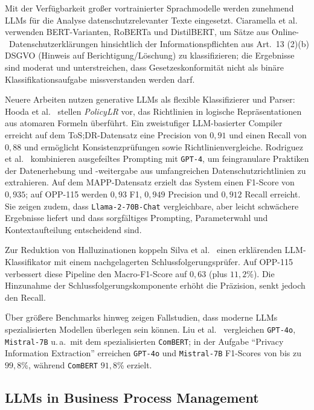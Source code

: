 Mit der Verfügbarkeit großer vortrainierter Sprachmodelle werden zunehmend \acp{LLM} für die Analyse datenschutzrelevanter Texte eingesetzt. Ciaramella et al.\ \cite{ciaramella2022leveraging} verwenden BERT-Varianten, RoBERTa und DistilBERT, um Sätze aus Online-\linebreak~Datenschutzerklärungen hinsichtlich der Informationspflichten aus Art.~13 (2)(b) \ac{DSGVO} (Hinweis auf Berichtigung/Löschung) zu klassifizieren; die Ergebnisse sind moderat und unterstreichen, dass Gesetzeskonformität nicht als binäre Klassifikationsaufgabe missverstanden werden darf.

Neuere Arbeiten nutzen generative \acp{LLM} als flexible Klassifizierer und Parser: Hooda et al.\ \cite{hooda2024policylr} stellen \emph{PolicyLR} vor, das Richtlinien in logische Repräsentationen aus atomaren Formeln überführt. Ein zweistufiger \ac{LLM}-basierter Compiler erreicht auf dem ToS;DR-Datensatz eine Precision von $0{,}91$ und einen Recall von $0{,}88$ und ermöglicht Konsistenzprüfungen sowie Richtlinienvergleiche. Rodriguez et al.\ \cite{rodriguez2024largelanguagemodels} kombinieren ausgefeiltes Prompting mit \texttt{GPT-4}, um feingranulare Praktiken der Datenerhebung und -weitergabe aus umfangreichen Datenschutzrichtlinien zu extrahieren. Auf dem MAPP-Datensatz erzielt das System einen F1-Score von $0{,}935$; auf OPP-115 werden $0{,}93$ F1, $0{,}949$ Precision und $0{,}912$ Recall erreicht. Sie zeigen zudem, dass \texttt{Llama-2-70B-Chat} vergleichbare, aber leicht schwächere Ergebnisse liefert und dass sorgfältiges Prompting, Parameterwahl und Kontextaufteilung entscheidend sind.

Zur Reduktion von Halluzinationen koppeln Silva et al.\ \cite{silva2024entailment} einen erklärenden \ac{LLM}-Klassifikator mit einem nachgelagerten Schlussfolgerungsprüfer. Auf OPP-115 verbessert diese Pipeline den Macro-F1-Score auf $0{,}63$ (plus $11{,}2$\%). Die Hinzunahme der Schlussfolgerungskomponente erhöht die Präzision, senkt jedoch den Recall.

Über größere Benchmarks hinweg zeigen Fallstudien, dass moderne \acp{LLM} spezialisierten Modellen überlegen sein können. Liu et al.\ \cite{liu2024privacy} vergleichen \texttt{GPT-4o}, \texttt{Mistral-7B} u.\,a.\ mit dem spezialisierten \texttt{ComBERT}; in der Aufgabe \enquote{Privacy Information Extraction} erreichen \texttt{GPT-4o} und \texttt{Mistral-7B} F1-Scores von bis zu $99{,}8$\%, während \texttt{ComBERT} $91{,}8$\% erzielt.

\subsection*{\acp{LLM} in Business Process Management}

